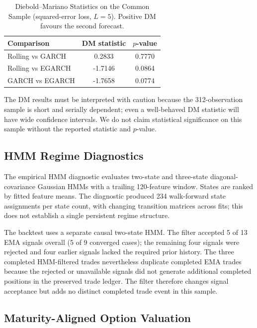 \documentclass[journal]{IEEEtran}
\begin{document}
\begin{table}[!t]
\renewcommand{\arraystretch}{1.2}
\caption{Diebold--Mariano Statistics on the Common Sample (squared-error loss, $L=5$). Positive DM favours the second forecast.}
\label{tab:dm}
\centering
\begin{tabular}{lcc}
\toprule
\textbf{Comparison} & \textbf{DM statistic} & \textbf{$p$-value} \\
\midrule
Rolling vs GARCH        & 0.2833 & 0.7770 \\
Rolling vs EGARCH       & -1.7146 & 0.0864 \\
GARCH vs EGARCH         & -1.7658 & 0.0774 \\
\bottomrule
\end{tabular}
\end{table}

The DM results must be interpreted with caution because the 312-observation sample is short and serially dependent; even a well-behaved DM statistic will have wide confidence intervals. We do not claim statistical significance on this sample without the reported statistic and $p$-value.

\subsection{HMM Regime Diagnostics}

The empirical HMM diagnostic evaluates two-state and three-state diagonal-covariance Gaussian HMMs with a trailing 120-feature window. States are ranked by fitted feature means. The diagnostic produced 234 walk-forward state assignments per state count, with changing transition matrices across fits; this does not establish a single persistent regime structure.

The backtest uses a separate causal two-state HMM. The filter accepted 5 of 13 EMA signals overall (5 of 9 converged cases); the remaining four signals were rejected and four earlier signals lacked the required prior history. The three completed HMM-filtered trades nevertheless duplicate completed EMA trades because the rejected or unavailable signals did not generate additional completed positions in the preserved trade ledger. The filter therefore changes signal acceptance but adds no distinct completed trade event in this sample.

\subsection{Maturity-Aligned Option Valuation}
\end{document}
